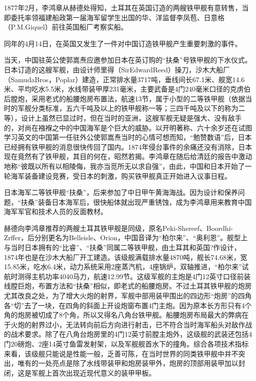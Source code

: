 \documentclass[12pt,UTF8]{ctexbook}
\begin{document}
1877年2月，李鸿章从赫德处得知，土耳其在英国订造的两艘铁甲舰有意转售，当即委托率领福建船政第一届海军留学生出国的华、洋监督李凤苞、日意格（P.M.Giquel）前往英国船厂考察实船。

同年的4月14日，在英国又发生了一件对中国订造铁甲舰产生重要刺激的事件。

当天，中国驻英公使郭嵩焘应邀参加日本在英订购的“扶桑”号铁甲舰的下水仪式。日本订造的这艘军舰，由设计师里得（SirEdwardReed）操刀，沙木大船厂（SamudaBros，Poplar）建造，正常排水量3717吨，垂线间长67.1米、舰宽14.6米、平均吃水5.5米，水线带装甲厚231毫米，主要武备是4门240毫米口径的克虏伯后膛炮，采用老式的船腰炮房布置法，航速13节，属于小型的二等铁甲舰（依据当时的军舰分类标准，五六千吨及以上的铁甲舰称一等；三四千吨及以下的称为二等），设计上虽然已显过时，但在当时的亚洲，这艘军舰无疑是强大、没有敌手的，对尚在襁褓之中的中国海军是个巨大的威胁。以开明著称、六十余岁还在试图学习英文的中国第一任驻外公使郭嵩焘当时的心情可想而知，“勉赞数语”后，日本已经拥有铁甲舰的消息很快传回了国内。1874年侵台事件的余痛还没有消除，日本现在竟然有了铁甲舰，其目的何在，昭然若揭。李鸿章在随后给清廷的报告中激动地称“彼既以所有以相陵侮，我亦当觅所无以求自强”，由此，中国和日本开始了一轮海军装备建设竞赛，受日本的刺激，购买铁甲舰真正开始进入议事日程。

日本海军二等铁甲舰“扶桑”，后来参加了中日甲午黄海海战。因为设计和保养问题，“扶桑”装备日本海军后，很快船体就出现严重锈蚀，成为李鸿章用来教育中国海军军官和技术人员的反面教材。

赫德向李鸿章推荐的两艘土耳其铁甲舰是同级，原名Peki-Shereef、Boordhi-Zrffer，后分别更名为Belleisle、Orion，中国音译为“柏尔来”、“奥利恩”。舰型上与当时日本拥有的“比睿”、“扶桑”同属二等铁甲舰，由土耳其和英国?作设计，1874年也是在沙木大船厂开工建造。该级舰满载排水量4870吨，舰长74.68米，宽15.85米，吃水6.4米，动力系统采用2座蒸汽机，4座锅炉，双轴推进，“柏尔来”试航时测得主机功率4040马力，航速12.99节。这级军舰的主炮是4门12英寸口径前装线膛巨炮，布置方法和“扶桑”相似，即老式的船腰炮房。不过土耳其铁甲舰的炮房尤其改良之处，为了增大火炮的射界，军舰中部用装甲围出的四边形“炮房”的四角各“切”去了一块，在四角的斜面上开设炮窗布置4门主炮。因为原本长方形只有4个角的炮房被切成了8个角，所以又得名八角台铁甲舰。船腰炮房布局最大的弊病在于火炮的射界过小，无法转向前后方向进行射击，已不符合当时海军船头对敌作战的战术要求。除了在八角台炮房里的4门12英寸前膛主炮外，这级舰的武装还包括4门20磅炮、2座14英寸鱼雷发射架，以及军舰舰首水下的撞角。综合各项技术指标来看，该级舰只能说是性能一般，乏善可陈，在当时世界的同类铁甲舰中并不突出，唯有的一处亮点是除了水线带装甲和炮房装甲外，炮房的顶部用装甲加以封闭，这是军舰上首次出现近现代意义的装甲甲板。
\end{document}
